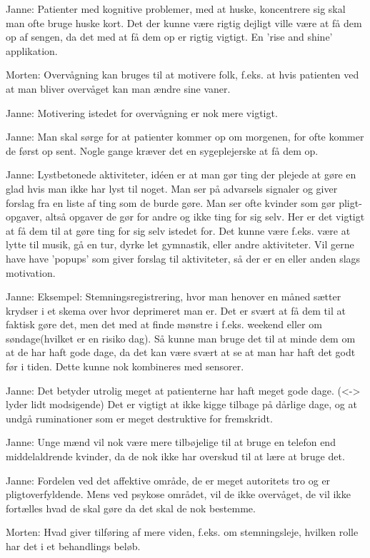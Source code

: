 Janne: Patienter med kognitive problemer, med at huske, koncentrere sig skal man ofte bruge huske kort. Det der kunne være rigtig dejligt ville være at få dem op af sengen, da det med at få dem op er rigtig vigtigt. En 'rise and shine' applikation.

Morten: Overvågning kan bruges til at motivere folk, f.eks. at hvis patienten ved at man bliver overvåget kan man ændre sine vaner.

Janne: Motivering istedet for overvågning er nok mere vigtigt.

Janne: Man skal sørge for at patienter kommer op om morgenen, for ofte kommer de først op sent. Nogle gange kræver det en sygeplejerske at få dem op.

Janne: Lystbetonede aktiviteter, idéen er at man gør ting der plejede at gøre en glad hvis man ikke har lyst til noget. Man ser på advarsels signaler og giver forslag fra en liste af ting som de burde gøre. Man ser ofte kvinder som gør pligt-opgaver, altså opgaver de gør for andre og ikke ting for sig selv. Her er det vigtigt at få dem til at gøre ting for sig selv istedet for. Det kunne være f.eks. være at lytte til musik, gå en tur, dyrke let gymnastik, eller andre aktiviteter. Vil gerne have have 'popups' som giver forslag til aktiviteter, så der er en eller anden slags motivation. 

Janne: Eksempel: Stemningsregistrering, hvor man henover en måned sætter krydser i et skema over hvor deprimeret man er. Det er svært at få dem til at faktisk gøre det, men det med at finde mønstre i f.eks. weekend eller om søndage(hvilket er en risiko dag). Så kunne man bruge det til at minde dem om at de har haft gode dage, da det kan være svært at se at man har haft det godt før i tiden. Dette kunne nok kombineres med sensorer. 

Janne: Det betyder utrolig meget at patienterne har haft meget gode dage. (<-> lyder lidt modsigende) Det er vigtigt at ikke kigge tilbage på dårlige dage, og at undgå ruminationer som er meget destruktive for fremskridt.

Janne: Unge mænd vil nok være mere tilbøjelige til at bruge en telefon end middelaldrende kvinder, da de nok ikke har overskud til at lære at bruge det.

Janne: Fordelen ved det affektive område, de er meget autoritets tro og er pligtoverfyldende. Mens ved psykose området, vil de ikke overvåget, de vil ikke fortælles hvad de skal gøre da det skal de nok bestemme. 

Morten: Hvad giver tilføring af mere viden, f.eks. om stemningsleje, hvilken rolle har det i et behandlings beløb. 

